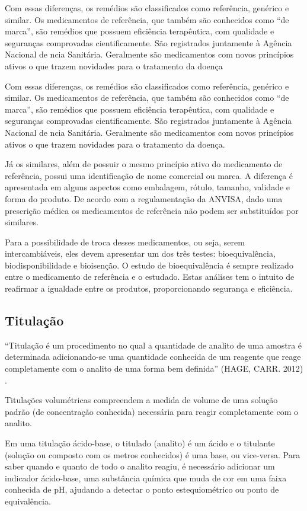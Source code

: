 Com essas diferenças, os remédios são classificados como referência, genérico e similar. Os medicamentos
de referência, que também são conhecidos como “de marca”, são remédios que possuem eficiência
terapêutica, com qualidade e seguranças comprovadas cientificamente. São registrados juntamente à Agência
Nacional de ncia Sanitária. Geralmente são medicamentos com novos princípios ativos o que trazem
novidades para o tratamento da doença

Com essas diferenças, os remédios são classificados como referência, genérico e similar. Os medicamentos
de referência, que também são conhecidos como “de marca”, são remédios que possuem eficiência
terapêutica, com qualidade e seguranças comprovadas cientificamente. São registrados juntamente à Agência
Nacional de ncia Sanitária. Geralmente são medicamentos com novos princípios ativos o que trazem
novidades para o tratamento da doença.

Já os similares, além de possuir o mesmo princípio ativo do medicamento de referência, possui uma
identificação de nome comercial ou marca. A diferença é apresentada em alguns aspectos como embalagem,
rótulo, tamanho, validade e forma do produto. De acordo com a regulamentação da ANVISA, dado uma
prescrição médica os medicamentos de referência não podem ser substituídos por similares.

Para a possibilidade de troca desses medicamentos, ou seja, serem intercambiáveis, eles devem apresentar
um dos três testes: bioequivalência, biodisponibilidade e bioisenção. O estudo de bioequivalência é
sempre realizado entre o medicamento de referência e o estudado. Estas análises tem o intuito de
reafirmar a igualdade entre os produtos, proporcionando segurança e eficiência. \cite{ache2015}

\subsection{Titulação}\label{titulacao}

``Titulação é um procedimento no qual a quantidade de analito de uma amostra é determinada
adicionando-se uma quantidade conhecida de um reagente que reage completamente com o analito de
uma forma bem definida'' (HAGE, CARR. 2012) \cite{Hage2012}.

Titulações volumétricas compreendem a medida de volume de uma solução padrão (de concentração
conhecida) necessária para reagir completamente com o analito. \cite{Skoog2014}

Em uma titulação ácido-base, o titulado (analito) é um ácido e o titulante (solução ou composto com
os metros conhecidos) é uma base, ou vice-versa. Para saber quando e quanto de todo o analito
reagiu, é necessário adicionar um indicador ácido-base, uma substância química que muda de cor em uma
faixa conhecida de pH, ajudando a detectar o ponto estequiométrico ou ponto de equivalência.


